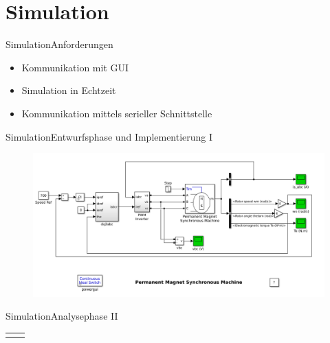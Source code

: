 \author{Franz Welker}
\section{Simulation}
	
	\begin{frame}{Simulation}{Anforderungen}
	  \begin{itemize}
	    \item Kommunikation mit GUI
	    \item Simulation in Echtzeit
	    \item Kommunikation mittels serieller Schnittstelle
	  \end{itemize}
	\end{frame}

	\begin{frame}{Simulation}{Entwurfsphase und Implementierung I}
	  	\begin{figure}[htbp]
	  		\centering
	  		\includegraphics[width=\textwidth]{../sim/pictures/powerPmmotor.png}
	  	\end{figure}
	\end{frame}

	\begin{frame}{Simulation}{Analysephase II}
		\begin{center}
		\begin{tabular}{cc}
			\begin{minipage}{0.4\textwidth} 
				
			\end{minipage}	
			&  
			\begin{minipage}{0.4\textwidth}
				\vspace{-0.35cm}
					
			\end{minipage}	
			\\ 
		\end{tabular} 
	
		\vspace{0.5cm}
		
	\end{center}
	\end{frame}

